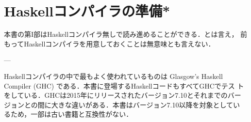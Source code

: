 \documentclass[a5paper,twoside,fleqn,draft]{jsbook}
\newcommand{\programminglanguage}[1]{\textsf{#1}}
\newcommand{\clang}{\programminglanguage{C}}
\newcommand{\clangkr}{\programminglanguage{K\&R~C}}
\newcommand{\haskell}{\programminglanguage{Haskell}}
\newcommand{\code}[1]{\texttt{#1}}
\newenvironment{ccode}{\begin{itembox}[r]{\clang}}{\end{itembox}}
\newenvironment{ckrcode}{\begin{itembox}[r]{\clangkr}}{\end{itembox}}
\begin{document}






\section{\haskell コンパイラの準備*}

本書の第I部は\haskell コンパイラ無しで読み進めることができる．とは言え，
前もって\haskell コンパイラを用意しておくことは無意味とも言えない．

---

\haskell コンパイラの中で最もよく使われているものは Glasgow's Haskell
Compiler (GHC) である．本書に登場する\haskell コードもすべてGHCでテス
トをしている．GHCは2015年にリリースされたバージョン7.10とそれまでのバー
ジョンとの間に大きな違いがある．本書はバージョン7.10以降を対象としてい
るため，一部は古い書籍と互換性がない．
\end{document}
